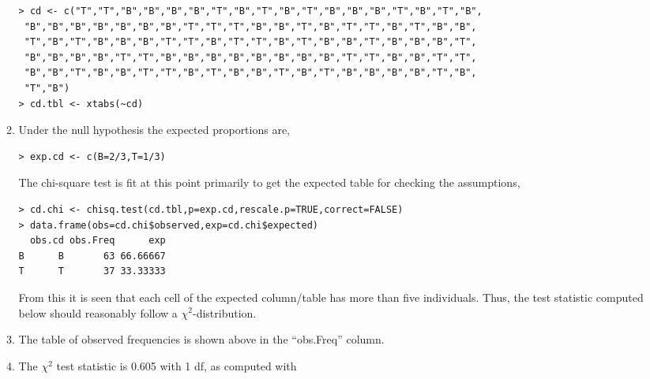 \documentclass[10pt,openany]{book}\usepackage[]{graphicx}\usepackage[]{color}
\makeatletter
\newenvironment{kframe}{%
 \def\at@end@of@kframe{}%
 \ifinner\ifhmode%
  \def\at@end@of@kframe{\end{minipage}}%
  \begin{minipage}{\columnwidth}%
 \fi\fi%
 \def\FrameCommand##1{\hskip\@totalleftmargin \hskip-\fboxsep
 \colorbox{shadecolor}{##1}\hskip-\fboxsep
     \hskip-\linewidth \hskip-\@totalleftmargin \hskip\columnwidth}%
 \MakeFramed {\advance\hsize-\width
   \@totalleftmargin\z@ \linewidth\hsize
   \@setminipage}}%
 {\par\unskip\endMakeFramed%
 \at@end@of@kframe}
\newenvironment{knitrout}{}{} %
\makeatother
\begin{document}
\begin{itemize}
\begin{enumerate}
\begin{knitrout}
\color{fgcolor}\begin{kframe}
\begin{verbatim}
> cd <- c("T","T","B","B","B","B","T","B","T","B","T","B","B","B","T","B","T","B",
 "B","B","B","B","B","B","B","T","T","T","B","B","T","B","T","T","B","T","B","B",
 "T","B","T","B","B","B","T","T","B","T","T","B","T","B","B","T","B","B","B","T",
 "B","B","B","B","T","T","B","B","B","B","B","B","B","B","T","T","B","B","T","T",
 "B","B","T","B","B","T","T","B","T","B","B","T","B","T","B","B","B","B","T","B",
 "T","B")
> cd.tbl <- xtabs(~cd)
\end{verbatim}
\end{kframe}
\end{knitrout}
      \item Under the null hypothesis the expected proportions are,
\begin{knitrout}
\color{fgcolor}\begin{kframe}
\begin{verbatim}
> exp.cd <- c(B=2/3,T=1/3)
\end{verbatim}
\end{kframe}
\end{knitrout}
The chi-square test is fit at this point primarily to get the expected table for checking the assumptions,
\begin{knitrout}
\color{fgcolor}\begin{kframe}
\begin{verbatim}
> cd.chi <- chisq.test(cd.tbl,p=exp.cd,rescale.p=TRUE,correct=FALSE)
> data.frame(obs=cd.chi$observed,exp=cd.chi$expected)
  obs.cd obs.Freq      exp
B      B       63 66.66667
T      T       37 33.33333
\end{verbatim}
\end{kframe}
\end{knitrout}
From this it is seen that each cell of the expected column/table has more than five individuals.  Thus, the test statistic computed below should reasonably follow a $\chi^{2}$-distribution.
      \item The table of observed frequencies is shown above in the ``obs.Freq'' column.
      \item The $\chi^{2}$ test statistic is 0.605 with 1 df, as computed with
\begin{knitrout}
\color{fgcolor}\begin{kframe}

\end{kframe}
\end{knitrout}
\end{enumerate}
\end{itemize}
\end{document}

